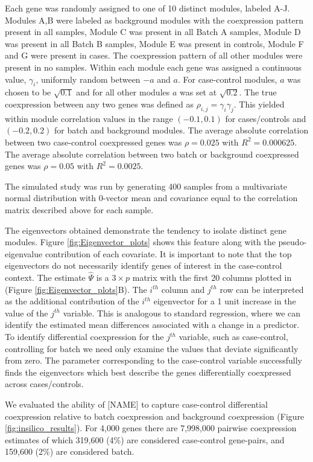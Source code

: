 Each gene was randomly assigned to one of 10 distinct modules, labeled
A-J. Modules A,B were labeled as background modules with the coexpression
pattern present in all samples, Module C was present in all Batch
A samples, Module D was present in all Batch B samples, Module E was
present in controls, Module F and G were present in cases. The coexpression
pattern of all other modules were present in no samples. Within each
module each gene was assigned a continuous value, $\gamma_{i}$, uniformly
random between $-a$ and $a$. For case-control modules, $a$ was
chosen to be $\sqrt{0.1}$ and for all other modules $a$ was set
at $\sqrt{0.2}$. The true coexpression between any two genes was
defined as $\rho_{i,j}=\gamma_{i}\gamma_{j}$. This yielded within
module correlation values in the range $\left(-0.1,0.1\right)$ for
cases/controls and $\left(-0.2,0.2\right)$ for batch and background
modules. The average absolute correlation between two case-control
coexpressed genes was $\rho=0.025$ with $R^{2}=0.000625$. The average
absolute correlation between two batch or background coexpressed genes
was $\rho=0.05$ with $R^{2}=0.0025$. 

The simulated study was run by generating 400 samples from a multivariate
normal distribution with 0-vector mean and covariance equal to the
correlation matrix described above for each sample.

The eigenvectors obtained demonstrate the tendency to isolate distinct
gene modules. Figure \ref{fig:Eigenvector_plots} shows this feature
along with the pseudo-eigenvalue contribution of each covariate. It
is important to note that the top eigenvectors do not necessarily
identify genes of interest in the case-control context. The estimate
$\hat{\Psi}$ is a $3\times p$ matrix with the first 20 columns plotted
in (Figure \ref{fig:Eigenvector_plots}B). The $i^{th}$ column and
$j^{th}$ row can be interpreted as the additional contribution of
the $i^{th}$ eigenvector for a 1 unit increase in the value of the
$j^{th}$ variable. This is analogous to standard regression, where
we can identify the estimated mean differences associated with a change
in a predictor. To identify differential coexpression for the $j^{th}$
variable, such as case-control, controlling for batch we need only
examine the values that deviate significantly from zero. The parameter
corresponding to the case-control variable successfully finds the
eigenvectors which best describe the genes differentially coexpressed
across cases/controls.

We evaluated the ability of {[}NAME{]} to capture case-control differential
coexpression relative to batch coexpression and background coexpression
(Figure \ref{fig:insilico_results}). For 4,000 genes there are 7,998,000
pairwise coexpression estimates of which 319,600 (4\%) are considered
case-control gene-pairs, and 159,600 (2\%) are considered batch.

